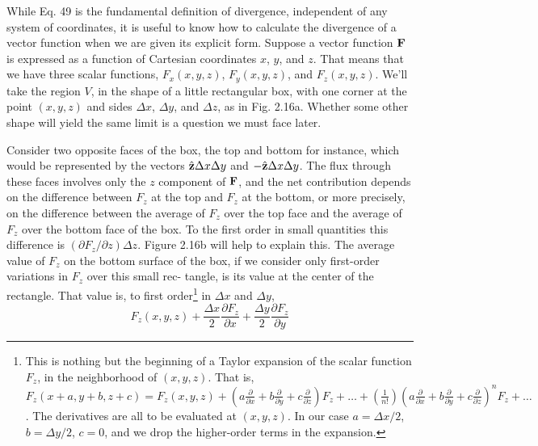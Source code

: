 While Eq. 49 is the fundamental definition of divergence, independent
of any system of coordinates, it is useful to know how to
calculate the divergence of a vector function when we are given its
explicit form. Suppose a vector function $\mathbf{F}$ is expressed as a function
of Cartesian coordinates $x$, $y$, and $z$. That means that we have three
scalar functions, $F_x(x,y,z)$, $F_y(x,y,z)$, and $F_z(x,y,z)$. We'll take the
region $V$, in the shape of a little rectangular box, with one corner at
the point $(x,y,z)$ and sides $\Delta x$, $\Delta y$, and $\Delta z$, as in Fig. 2.16a. Whether
some other shape will yield the same limit is a question we must face
later.

Consider two opposite faces of the box, the top and bottom for
instance, which would be represented by the vectors $\hat{\mathbf{z}} \Delta x\Delta y$ and
$-\hat{\mathbf{z}} \Delta x\Delta y$. The flux through these faces involves only the $z$ component
of $\mathbf{F}$, and the net contribution depends on the difference between
$F_z$ at the top and $F_z$ at the bottom, or more precisely, on the
difference between the average of $F_z$ over the top face and the average
of $F_z$ over the bottom face of the box. To the first order in small
quantities this difference is $(\partial F_z/\partial z)\Delta z$. Figure 2.16b will help to explain
this. The average value of $F_z$ on the bottom surface of the box,
if we consider only first-order variations in $F_z$ over this small rec-
tangle, is its value at the center of the rectangle. That value is, to
first order\footnote{
This is nothing but the beginning of a Taylor expansion of the scalar function $F_z$,
in the neighborhood of $(x,y,z)$. That is, $F_z(x + a, y + b, z + c) =
F_z(x,y,z) +(a\frac{\partial}{\partial x}+b\frac{\partial}{\partial y}+c\frac{\partial}{\partial z})F_z
+\ldots+\left(\frac{1}{n!}\right)
  (a\frac{\partial}{\partial x}+b\frac{\partial}{\partial y}+c\frac{\partial}{\partial z})^nF_z
+\ldots$. The derivatives are
all to be evaluated at $(x,y,z)$. In our case $a=\Delta x/2$, $b=\Delta y/2$, $c=0$,
and we drop the higher-order terms in the 
expansion.} in $\Delta x$ and $\Delta y$,
\begin{equation}
  F_z(x,y,z)+\frac{\Delta x}{2}\frac{\partial F_z}{\partial x}
            +\frac{\Delta y}{2}\frac{\partial F_z}{\partial y}
\end{equation}

